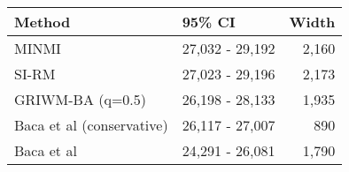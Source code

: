 
\begin{tabular}{llr}
\toprule
Method & 95\% CI & Width\\
\midrule
MINMI & 27,032 - 29,192 & 2,160\\
SI-RM & 27,023 - 29,196 & 2,173\\
GRIWM-BA (q=0.5) & 26,198 - 28,133 & 1,935\\
Baca et al (conservative) & 26,117 - 27,007 & 890\\
Baca et al & 24,291 - 26,081 & 1,790\\
\bottomrule
\end{tabular}
